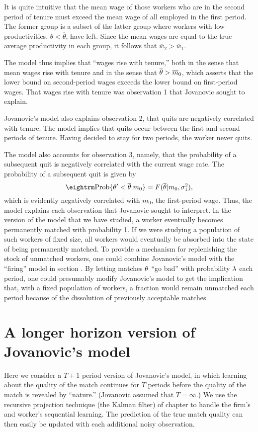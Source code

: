 It is quite intuitive that the mean wage of those workers who are in the
second period of tenure must exceed the mean wage of all employed in the
first period. The former group is a subset of the latter group where
workers with low productivities, $\theta<\overline \theta$, have left.
Since the mean wages are equal to the true average productivity in
each group, it follows that $\overline w_2 > \overline w_1$.

The model thus implies that ``wages rise with tenure,'' both in the sense that
mean wages rise with tenure and in the sense that $\overline{{\theta}}>\overline m_0$, which
asserts that the lower bound on second-period wages exceeds the lower bound on
first-period wages.  That wages rise with tenure was observation 1 that
Jovanovic sought to explain.

Jovanovic's model also explains observation 2, that quits are negatively
correlated with tenure.  The model implies that quits occur between the first
and second periods of tenure.  Having decided to stay for two periods, the
worker never quits.

The model also accounts for observation 3, namely, that the probability of a
subsequent quit is negatively correlated with the current wage rate.  The
probability of a subsequent quit is given by
$${\rm Prob}\{\th'<\overline\th|m_0\} =
F(\overline \th|m_0,\sigma_1^2),$$
which is evidently negatively correlated with $m_0$, the first-period wage.
Thus, the model explains each observation that Jovanovic sought to interpret.
In the version of the model that we have studied, a worker eventually becomes
permanently matched with probability 1.  If we were studying a population of
such workers of fixed size, all workers would eventually be absorbed into the
state of being permanently matched.  To provide a mechanism for replenishing
the stock of unmatched workers, one could combine Jovanovic's model
with the ``firing'' model in section .
  By letting matches ${\theta}$
``go bad'' with probability $\lambda$ each period, one could presumably modify
Jovanovic's model to get the implication that, with a fixed population of
workers, a fraction would remain unmatched each period because of the
dissolution of previously acceptable matches.

\section{A longer horizon version of Jovanovic's model}

Here we consider a $T+1$ period
version of Jovanovic's model, in which learning about the quality of the match
continues for $T$ periods before the quality of the match is revealed by
``nature.''  (Jovanovic assumed that $T = \infty$.)  We use the
recursive projection technique (the Kalman filter)
 of chapter  to handle the firm's and
worker's sequential learning. The prediction of
the true match quality can then easily be updated with each additional
noisy observation.

